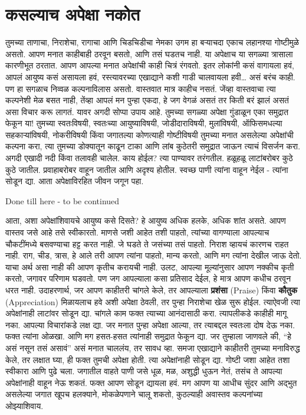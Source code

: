  \chapter{कसल्याच अपेक्षा नकोत }
तुमच्या ताणाचा, निराशेचा, रागाचा आणि चिडचिडीचा नेमका उगम हा बऱ्याचदा एकाच लहानश्या गोष्टीमुळे असतो. आपण मनात काहीबाही ठरवून बसतो, आणि तसं घडतच नाही. या अपेक्षाच या सगळ्या त्रासाला कारणीभूत ठरतात.
आपण आपल्या मनात अपेक्षांची काही चित्रं रंगवतो. इतर लोकांनी कसं वागायला हवं, आपलं आयुष्य कसं असायला हवं, रस्त्यावरच्या एखाद्याने कशी गाडी चालवायला हवी… असं बरंच काही. पण हा सगळाच निव्वळ कल्पनाविलास असतो. वास्तवात मात्र काहीच नसतं.
जेंव्हा वास्तवाचा त्या कल्पनेशी मेळ बसत नाही, तेंव्हा आपलं मन पुन्हा एकदा, हे जग वेगळं असतं तर किती बरं झालं असतं असा विचार करू लागतं.
यावर अगदी सोप्पा उपाय आहे.
तुमच्या सगळ्या अपेक्षा गुंडाळून एका समुद्रात फेकून या!
तुमच्या स्वतःविषयी, स्वतःच्या आयुष्याविषयी, जोडीदाराविषयी, मुलांविषयी, ऑफिसमधल्या सहकाऱ्यांविषयी, नोकरीविषयी किंवा जगातल्या कोणत्याही गोष्टीविषयी तुमच्या मनात असलेल्या अपेक्षांची कल्पना करा, त्या तुमच्या डोक्यातून काढून टाका आणि लांब कुठेतरी समुद्रात जाऊन त्याचं विसर्जन करा. अगदी एखादी नदी किंवा तलावही चालेल.
काय होईल? त्या पाण्यावर तरंगतील. हळूहळू लाटांबरोबर कुठे कुठे जातील. प्रवाहाबरोबर वाहून जातील आणि अदृश्य होतील. स्वच्छ पाणी त्यांना वाहून नेईल - त्यांना सोडून द्या.
आता अपेक्षाविरहित जीवन जगून पहा.

Done till here - to be continued

आता, अशा अपेक्षांशिवायचे आयुष्य कसे दिसते? हे आयुष्य अधिक हलके, अधिक शांत असते. आपण वास्तव जसे आहे तसे स्वीकारतो. माणसे जशी आहेत तशी पाहतो, त्यांच्या वागण्याला आपल्याच चौकटींमध्ये बसवण्याचा हट्ट करत नाही. जे घडते ते जसंच्या तसं पाहतो. निराश व्हायचं कारणच राहत नाही. राग, चीड, त्रास, हे आले तरी आपण त्यांना पाहतो, मान्य करतो, आणि मग त्यांना देखील जाऊ देतो.
याचा अर्थ असा नाही की आपण कृतीच करायची नाही. उलट, आपल्या मूल्यांनुसार आपण नक्कीच कृती करतो, जगावर परिणाम घडवतो. पण जग आपल्याला कसा प्रतिसाद देईल, हे मात्र आपण कधीच ठरवून धरत नाही.
उदाहरणार्थ, जर आपण काहीतरी चांगले केले, तर आपल्याला \textbf{प्रशंसा} (Praise) किंवा \textbf{कौतुक} (Appreciation) मिळायलाच हवे अशी अपेक्षा ठेवली, तर पुन्हा निराशेचा खेळ सुरू होईल. त्याऐवजी त्या अपेक्षांनाही लाटांवर सोडून द्या. चांगले काम फक्त त्याच्या आनंदासाठी करा. त्यापलीकडे काहीही मागू नका.
आपल्या विचारांकडे लक्ष द्या. जर मनात पुन्हा अपेक्षा आल्या, तर त्याबद्दल स्वतःला दोष देऊ नका. फक्त त्यांना ओळखा. आणि मग हसत-हसत त्यांनाही समुद्रात फेकून द्या.
जर तुम्हाला जाणवले की, “हे असं नसून तसं असावं” असं मनात चाललंय, तर सावध व्हा. समजा एखाद्याने काहीतरी तुमच्या मनाविरुद्ध केले, तर लक्षात घ्या, ही फक्त तुमची अपेक्षा होती. त्या अपेक्षांनाही सोडून द्या. गोष्टी जशा आहेत तशा स्वीकारा आणि पुढे चला.
जगातील वाहते पाणी जसे धूळ, मळ, अशुद्धी धुऊन नेतं, तसंच ते आपल्या अपेक्षांनाही वाहून नेऊ शकतं. फक्त आपण सोडून द्यायला हवं. मग आपण या आधीच सुंदर आणि अद्भुत असलेल्या जगात खूपच हलक्याने, मोकळेपणाने चालू शकतो,  कुठल्याही अवास्तव कल्पनांच्या ओझ्याशिवाय.


